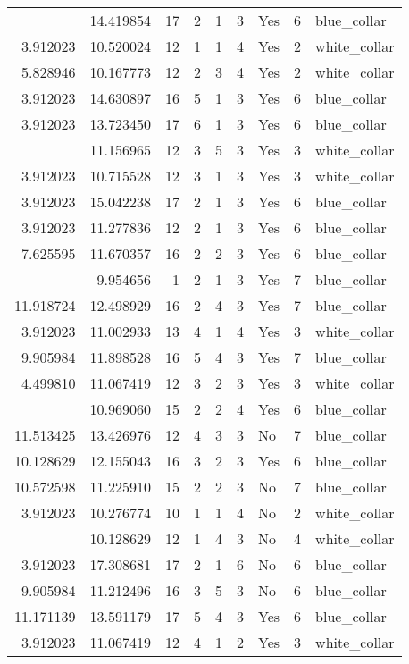 \documentclass[
]{article}
\begin{document}
\begin{longtable}[t]{rrrrrllrl}
\addlinespace
3.912023 & 14.419854 & 17 & 2 & 1 & 3 & Yes & 6 & blue\_collar\\
3.912023 & 10.520024 & 12 & 1 & 1 & 4 & Yes & 2 & white\_collar\\
5.828946 & 10.167773 & 12 & 2 & 3 & 4 & Yes & 2 & white\_collar\\
3.912023 & 14.630897 & 16 & 5 & 1 & 3 & Yes & 6 & blue\_collar\\
3.912023 & 13.723450 & 17 & 6 & 1 & 3 & Yes & 6 & blue\_collar\\
\addlinespace
9.215328 & 11.156965 & 12 & 3 & 5 & 3 & Yes & 3 & white\_collar\\
3.912023 & 10.715528 & 12 & 3 & 1 & 3 & Yes & 3 & white\_collar\\
3.912023 & 15.042238 & 17 & 2 & 1 & 3 & Yes & 6 & blue\_collar\\
3.912023 & 11.277836 & 12 & 2 & 1 & 3 & Yes & 6 & blue\_collar\\
7.625595 & 11.670357 & 16 & 2 & 2 & 3 & Yes & 6 & blue\_collar\\
\addlinespace
3.912023 & 9.954656 & 1 & 2 & 1 & 3 & Yes & 7 & blue\_collar\\
11.918724 & 12.498929 & 16 & 2 & 4 & 3 & Yes & 7 & blue\_collar\\
3.912023 & 11.002933 & 13 & 4 & 1 & 4 & Yes & 3 & white\_collar\\
9.905984 & 11.898528 & 16 & 5 & 4 & 3 & Yes & 7 & blue\_collar\\
4.499810 & 11.067419 & 12 & 3 & 2 & 3 & Yes & 3 & white\_collar\\
\addlinespace
7.803843 & 10.969060 & 15 & 2 & 2 & 4 & Yes & 6 & blue\_collar\\
11.513425 & 13.426976 & 12 & 4 & 3 & 3 & No & 7 & blue\_collar\\
10.128629 & 12.155043 & 16 & 3 & 2 & 3 & Yes & 6 & blue\_collar\\
10.572598 & 11.225910 & 15 & 2 & 2 & 3 & No & 7 & blue\_collar\\
3.912023 & 10.276774 & 10 & 1 & 1 & 4 & No & 2 & white\_collar\\
\addlinespace
4.007333 & 10.128629 & 12 & 1 & 4 & 3 & No & 4 & white\_collar\\
3.912023 & 17.308681 & 17 & 2 & 1 & 6 & No & 6 & blue\_collar\\
9.905984 & 11.212496 & 16 & 3 & 5 & 3 & No & 6 & blue\_collar\\
11.171139 & 13.591179 & 17 & 5 & 4 & 3 & Yes & 6 & blue\_collar\\
3.912023 & 11.067419 & 12 & 4 & 1 & 2 & Yes & 3 & white\_collar\\

\end{longtable}
\end{document}
